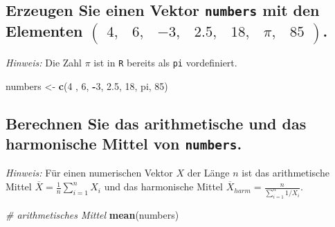 \documentclass[12pt,a4paper]{article}
\newenvironment{Shaded}{\begin{snugshade}}{\end{snugshade}}
\newcommand{\CommentTok}[1]{\textcolor[rgb]{0.56,0.35,0.01}{\textit{#1}}}
\newcommand{\DecValTok}[1]{\textcolor[rgb]{0.00,0.00,0.81}{#1}}
\newcommand{\FloatTok}[1]{\textcolor[rgb]{0.00,0.00,0.81}{#1}}
\newcommand{\FunctionTok}[1]{\textcolor[rgb]{0.13,0.29,0.53}{\textbf{#1}}}
\newcommand{\NormalTok}[1]{#1}
\newcommand{\OtherTok}[1]{\textcolor[rgb]{0.56,0.35,0.01}{#1}}
\newcommand{\SpecialCharTok}[1]{\textcolor[rgb]{0.81,0.36,0.00}{\textbf{#1}}}
\begin{document}
\hypertarget{erzeugen-sie-einen-vektor-mit-den-elementen-beginpmatrix-4-6--3-2.5-18-pi-85-endpmatrix.}{%
\subsection{\texorpdfstring{Erzeugen Sie einen Vektor \texttt{numbers}
mit den Elementen
\(\begin{pmatrix} 4, & 6, & -3, & 2.5, & 18, & \pi, & 85 \end{pmatrix}\).}{Erzeugen Sie einen Vektor  mit den Elementen \textbackslash begin\{pmatrix\} 4, \& 6, \& -3, \& 2.5, \& 18, \& \textbackslash pi, \& 85 \textbackslash end\{pmatrix\}.}}\label{erzeugen-sie-einen-vektor-mit-den-elementen-beginpmatrix-4-6--3-2.5-18-pi-85-endpmatrix.}}

\emph{Hinweis:} Die Zahl \(\pi\) ist in \texttt{R} bereits als
\texttt{pi} vordefiniert.

\begin{Shaded}
\begin{Highlighting}[]
\NormalTok{    numbers }\OtherTok{\textless{}{-}} \FunctionTok{c}\NormalTok{(}\DecValTok{4}\NormalTok{ , }\DecValTok{6}\NormalTok{, }\SpecialCharTok{{-}}\DecValTok{3}\NormalTok{, }\FloatTok{2.5}\NormalTok{, }\DecValTok{18}\NormalTok{, pi, }\DecValTok{85}\NormalTok{)}
\end{Highlighting}
\end{Shaded}

\vspace{0.5cm}

\hypertarget{berechnen-sie-das-arithmetische-und-das-harmonische-mittel-von-.}{%
\subsection{\texorpdfstring{Berechnen Sie das arithmetische und das
harmonische Mittel von
\texttt{numbers}.}{Berechnen Sie das arithmetische und das harmonische Mittel von .}}\label{berechnen-sie-das-arithmetische-und-das-harmonische-mittel-von-.}}

\emph{Hinweis:} Für einen numerischen Vektor \(X\) der Länge \(n\) ist
das arithmetische Mittel \(\overline{X} = \frac{1}{n} \sum_{i=1}^n X_i\)
und das harmonische Mittel
\(\overline{X}_{harm} = \frac{n}{\sum_{i=1}^n 1/X_i}\).

\begin{Shaded}
\begin{Highlighting}[]
    \CommentTok{\# arithmetisches Mittel}
    \FunctionTok{mean}\NormalTok{(numbers) }
\end{Highlighting}
\end{Shaded}
\end{document}
